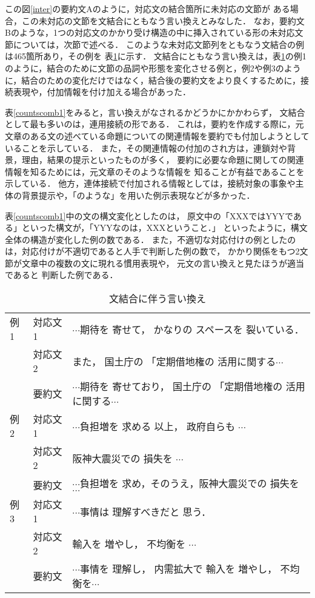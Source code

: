 この図\ref{inter}の要約文Aのように，対応文の結合箇所に未対応の文節が
ある場合，この未対応の文節を文結合にともなう言い換えとみなした．
なお，要約文Bのような，1つの対応文のかかり受け構造の中に挿入されている形の未対応文節については，次節で述べる．
このような未対応文節列をともなう文結合の例は465箇所あり，その例を
表\ref{sentcombi}に示す．
文結合にともなう言い換えは，表\ref{sentcombi}の例1のように，結合のために文節の品詞や形態を変化させる例と，例2や例3のように，結合のための変化だけではなく，結合後の要約文をより良くするために，接続表現や，付加情報を付け加える場合があった．

表\ref{countscomb1}をみると，言い換えがなされるかどうかにかかわらず，
文結合として最も多いのは，連用接続の形である．
これは，要約を作成する際に，元文章のある文の述べている命題についての関連情報を要約でも付加しようとしていることを示している．
また，その関連情報の付加のされ方は，連鎖対や背景，理由，結果の提示といったものが多く，
要約に必要な命題に関しての関連情報を知るためには，元文章のそのような情報を
知ることが有益であることを示している．
他方，連体接続で付加される情報としては，接続対象の事象や主体の背景提示や，「のような」を用いた例示表現などが多かった．

表\ref{countscomb1}中の文の構文変化としたのは，
原文中の「XXXではYYYである」といった構文が，「YYYなのは，XXXということ．」
といったように，構文全体の構造が変化した例の数である．
また，不適切な対応付けの例としたのは，対応付けが不適切であると人手で判断した例の数で，
かかり関係をもつ2文節が文章中の複数の文に現れる慣用表現や，
元文の言い換えと見たほうが適当であると
判断した例である．

\begin{table}
\caption{文結合に伴う言い換え} 
\label{sentcombi}
\begin{center}
\small
\begin{tabular}{|l|ll|}
\hline
例1&対応文1 & $\cdots$期待を 寄せて， かなりの スペースを 裂いている．\\
   &対応文2 & また， 国土庁の 「定期借地権の 活用に関する$\cdots$ \\
   &要約文  & $\cdots$期待を 寄せており， 国土庁の 「定期借地権の 活用に関する$\cdots$\\ \hline
例2&対応文1 & $\cdots$負担増を 求める 以上， 政府自らも $\cdots$\\
   &対応文2 &  阪神大震災での 損失を $\cdots$\\
   &要約文  & $\cdots$負担増を 求め，そのうえ，阪神大震災での 損失を$\cdots$\\ \hline
例3&対応文1 & $\cdots$事情は 理解すべきだと 思う．\\
   &対応文2 & 輸入を 増やし， 不均衡を $\cdots$\\
   &要約文  & $\cdots$事情を 理解し， 内需拡大で 輸入を 増やし， 不均衡を$\cdots$\\ \hline
\end{tabular}
\end{center}
\end{table}

